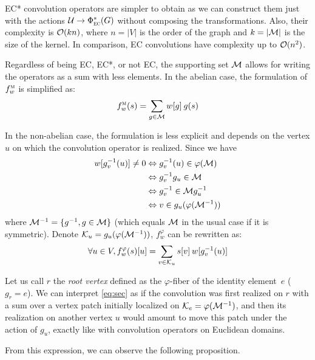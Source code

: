 \begin{remark}EC* convolution operators are simpler to obtain as we can construct them just with the actions $\cu \to \Phi^*_{\EC}(G)$ without composing the transformations. Also, their complexity is $\co(kn)$, where $n = |V|$ is the order of the graph and $k = |\cm|$ is the size of the kernel. In comparison, EC convolutions have complexity up to $\co(n^2)$.
\end{remark}

Regardless of being EC, EC*, or not EC, the supporting set $\cm$ allows for writing the operators as a sum with less elements. In the abelian case, the formulation of $f_w^{\M}$ is simplified as:
\begin{gather}
f_w^{\M}(s) = \displaystyle\sum_{g \in \cm} w[g] \h{2} g(s) \label{eq:secm}
\end{gather}

In the non-abelian case, the formulation is less explicit and depends on the vertex $u$ on which the convolution operator is realized. Since we have
\begin{align*}
w[g_v^{-1}(u)] \neq 0 & \Leftrightarrow g_v^{-1}(u) \in \varphi(\cm)\\
                    & \Leftrightarrow g_v^{-1}g_u \in \cm\\
                    & \Leftrightarrow g_v^{-1} \in \cm g_u^{-1}\\
                    & \Leftrightarrow v \in g_u(\varphi(\cm^{-1}))
\end{align*}
where $\cm^{-1} = \{ g^{-1}, g \in \cm\}$ (which equals $\cm$ in the usual case if it is symmetric). Denote $\ck_u = g_u(\varphi(\cm^{-1}))$, $f_w^{\varphi}$ can be rewritten as:
\begin{gather}
\forall u \in V, f_w^{\varphi}(s)[u] = \displaystyle\sum_{ v \in \ck_u} s[v] \h{2} w[g_v^{-1}(u)] \label{eq:sec}
\end{gather}

Let us call $r$ the \emph{root vertex} defined as the $\varphi$-fiber of the identity element~$e$ (\ie $g_r = e$). We can interpret \eqref{eq:sec} as if the convolution was first realized on $r$ with a sum over a vertex patch initially localized on $\ck_e = \varphi(\cm^{-1})$, and then its realization on another vertex $u$ would amount to move this patch under the action of $g_u$, exactly like with convolution operators on Euclidean domains.

From this expression, we can observe the following proposition.

